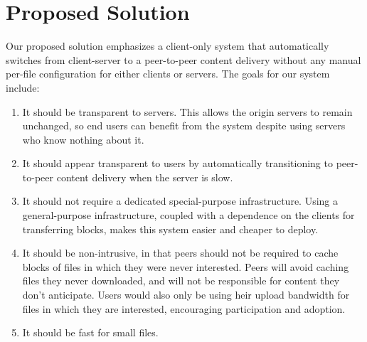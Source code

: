 \section {Proposed Solution}\label{section:solution}
Our proposed solution emphasizes a client-only system that automatically switches from client-server to a peer-to-peer content delivery without any manual per-file configuration for either clients or servers.  The goals for our system include:
\begin{enumerate}
\item It should be transparent to servers.  This allows the origin servers to remain unchanged, so end users can benefit from the system despite using servers who know nothing about it.
\item It should appear transparent to users by automatically transitioning to peer-to-peer content delivery when the server is slow.
\item It should not require a dedicated special-purpose infrastructure.  Using a general-purpose infrastructure, coupled with a dependence on the clients for transferring blocks, makes this system easier and cheaper to deploy.
\item It should be non-intrusive, in that peers should not be required to cache blocks of files in which they were never interested.  Peers will avoid caching files they never downloaded, and will not be responsible for content they don't anticipate.  Users would also only be using heir upload bandwidth for files in which they are interested, encouraging participation and adoption.
\item It should be fast for small files.
\end{enumerate}


